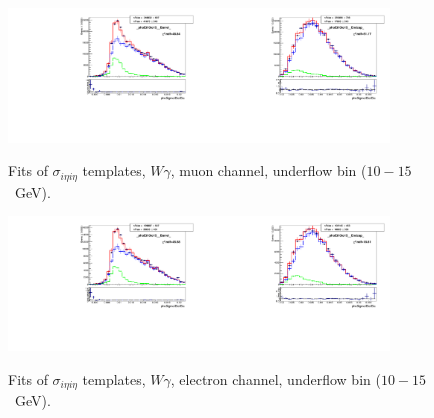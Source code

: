 \begin{figure}[htb]
  \begin{center}
   \includegraphics[width=0.45\textwidth]{../figs/figs_v11/MUON_WGamma/TemplateFits/c_TEMPL_SIHIH_UNblind__phoEt10to15__Barrel__RooFit.pdf}\includegraphics[width=0.45\textwidth]{../figs/figs_v11/MUON_WGamma/TemplateFits/c_TEMPL_SIHIH_UNblind__phoEt10to15__Endcap__RooFit.pdf}\\
  \label{fig:templateFits_SIHIH_MUON_0}
  \caption{Fits of $\sigma_{i \eta i \eta}$ templates, $W\gamma$, muon channel, underflow bin ($10-15$~GeV).}
  \end{center}
\end{figure}

\begin{figure}[htb]
  \begin{center}
   \includegraphics[width=0.45\textwidth]{../figs/figs_v11/ELECTRON_WGamma/TemplateFits/c_TEMPL_SIHIH_UNblind__phoEt10to15__Barrel__RooFit.pdf}\includegraphics[width=0.45\textwidth]{../figs/figs_v11/ELECTRON_WGamma/TemplateFits/c_TEMPL_SIHIH_UNblind__phoEt10to15__Endcap__RooFit.pdf}\\
  \label{fig:templateFits_SIHIH_ELECTRON_0}
  \caption{Fits of $\sigma_{i \eta i \eta}$ templates, $W\gamma$, electron channel, underflow bin ($10-15$~GeV).}
  \end{center}
\end{figure}

